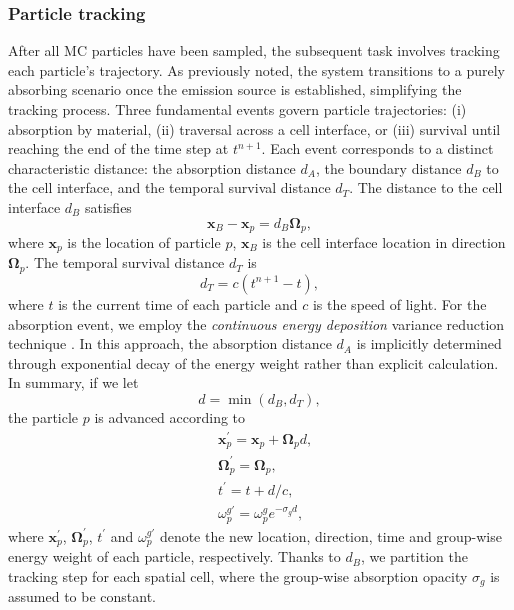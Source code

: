 \documentclass[preprint,12pt]{elsarticle}
\theoremstyle{definition}
\theoremstyle{plain}
\numberwithin{equation}{section}
\numberwithin{algorithm}{section}
\newcounter{eq_count}
\newcounter{tab_count}
\newcommand{\vOmega}{\mathbf{\Omega}}
\newcommand{\vx}{\mathbf{x}}
\begin{document}
\subsubsection{Particle tracking}
 After all MC particles have been sampled, the subsequent task involves tracking each particle's trajectory.  As previously noted, the system transitions to a purely absorbing scenario once the emission source is established, simplifying the tracking process. Three fundamental events govern particle trajectories:  (i) absorption by material, (ii) traversal across a cell interface, or (iii) survival until reaching the end of the time step at  $t^{n+1} $. Each event corresponds to a distinct characteristic distance:  the absorption distance $d_A$, the boundary distance $d_B$ to the cell interface, and the temporal survival distance  $d_T$. The distance to the cell interface $d_B$ satisfies
 \begin{equation*}
     \vx_B - \vx_p = d_B \vOmega_p,
 \end{equation*}
 where $\vx_p$ is the location of particle $p$, $\vx_B$ is the cell interface location in direction $\vOmega_p$. The temporal survival distance $d_T$  is
 \begin{equation*}
     d_T = c (t^{n+1} - t),
 \end{equation*}
 where $t$ is the current time of each particle and $c$ is the speed of light. For the absorption event, we employ the \textit{continuous energy deposition} variance reduction technique  \cite{fleck1971implicit}. In this approach, the absorption distance $d_A$ is implicitly determined through exponential decay  of the energy weight rather than explicit calculation.
In summary, if we let 
\begin{equation*}
    d = \min{(d_B,d_T)},
\end{equation*}
the particle $p$ is advanced according to
\begin{equation*}
    \begin{aligned}
        &\vx_p^{'} = \vx_p + \vOmega_p d,
        \\
        &\vOmega_p^{'} = \vOmega_p,
        \\
        &t^{'} = t + d/c,
        \\ \label{CED}
        &\omega_p^{g'} = \omega_p^{g} e^{-\sigma_{g} d},
    \end{aligned}
\end{equation*}
where $\vx_p^{'}$, $\vOmega_p^{'}$, $t^{'}$ and $\omega_p^{g'} $  denote the new location, direction, time and group-wise energy weight of each particle, respectively. Thanks to $d_B$, we partition the tracking step for each spatial cell, where the group-wise absorption opacity $\sigma_g$ is assumed to be constant.
\end{document}
